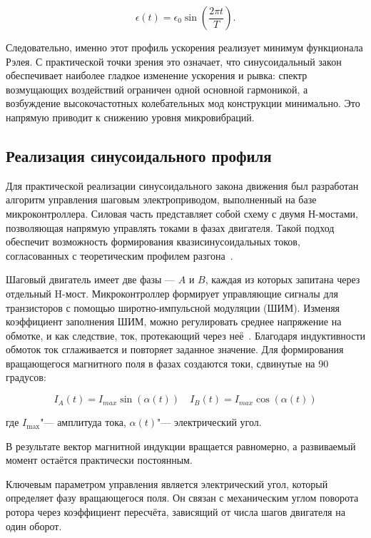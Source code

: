 \begin{equation}
	\epsilon(t) = \epsilon_0 \sin\left(\frac{2\pi t}{T}\right).
\end{equation}

Следовательно, именно этот профиль ускорения реализует минимум функционала Рэлея. С практической точки зрения это означает, что синусоидальный закон обеспечивает наиболее гладкое изменение ускорения и рывка: спектр возмущающих воздействий ограничен одной основной гармоникой, а возбуждение высокочастотных колебательных мод конструкции минимально. Это напрямую приводит к снижению уровня микровибраций.

\subsection{Реализация синусоидального профиля}

Для практической реализации синусоидального закона движения был разработан алгоритм управления шаговым электроприводом, выполненный на базе микроконтроллера. Силовая часть представляет собой схему с двумя Н-мостами, позволяющая напрямую управлять токами в фазах двигателя. Такой подход обеспечит возможность формирования квазисинусоидальных токов, согласованных с теоретическим профилем разгона~\cite{Athani1997}.

Шаговый двигатель имеет две фазы --- $A$ и $B$, каждая из которых запитана через отдельный H-мост. Микроконтроллер формирует управляющие сигналы для транзисторов с помощью широтно-импульсной модуляции (ШИМ). Изменяя коэффициент заполнения ШИМ, можно регулировать среднее напряжение на обмотке, и как следствие, ток, протекающий через неё~\cite{Virgala2015}. Благодаря индуктивности обмоток ток сглаживается и повторяет заданное значение. Для формирования вращающегося магнитного поля в фазах создаются токи, сдвинутые на 90 градусов: 

\begin{equation}
	\label{eq:current_setpper}
	I_{A}(t) = I_{max} \sin(\alpha (t)) \quad I_{B}(t) = I_{max} \cos (\alpha (t))
\end{equation}

где \(I_{\max}\)"--- амплитуда тока, \(\alpha(t)\)"--- электрический угол.

В результате вектор магнитной индукции вращается равномерно, а развиваемый момент остаётся практически постоянным.

Ключевым параметром управления является электрический угол, который определяет фазу вращающегося поля. Он связан с механическим углом поворота ротора через коэффициент пересчёта, зависящий от числа шагов двигателя на один оборот.

